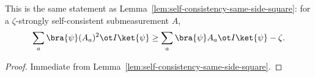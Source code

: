 \begin{theorem}\label{prop:cool-prop}
	\leanok
	This is the same statement as Lemma~\ref{lem:self-consistency-same-side-square}: for a $\zeta$-strongly self-consistent submeasurement $A$,
	\[
		\sum_a \bra{\psi} (A_a)^2 \ot I \ket{\psi} \geq \sum_a \bra{\psi} A_a \ot I \ket{\psi} -\zeta.
	\]
\end{theorem}
\begin{proof}
	\leanok
	Immediate from Lemma~\ref{lem:self-consistency-same-side-square}.
\end{proof}
